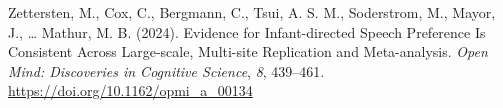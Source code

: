 \documentclass[
  english,
  man,floatsintext]{apa6}
\newlength{\cslhangindent}
\newenvironment{CSLReferences}[2] %
 {\begin{list}{}{%
  \setlength{\itemindent}{0pt}
  \setlength{\leftmargin}{0pt}
  \setlength{\parsep}{0pt}
  \ifodd #1
   \setlength{\leftmargin}{\cslhangindent}
   \setlength{\itemindent}{-1\cslhangindent}
  \fi
  \setlength{\itemsep}{#2\baselineskip}}}
 {\end{list}}
\begin{document}
\begin{CSLReferences}{1}{0}
Zettersten, M., Cox, C., Bergmann, C., Tsui, A. S. M., Soderstrom, M., Mayor, J., \ldots{} Mathur, M. B. (2024). Evidence for {Infant-directed Speech Preference Is Consistent Across Large-scale}, {Multi-site Replication} and {Meta-analysis}. \emph{Open Mind: Discoveries in Cognitive Science}, \emph{8}, 439--461. \url{https://doi.org/10.1162/opmi_a_00134}

\end{CSLReferences}
\end{document}
